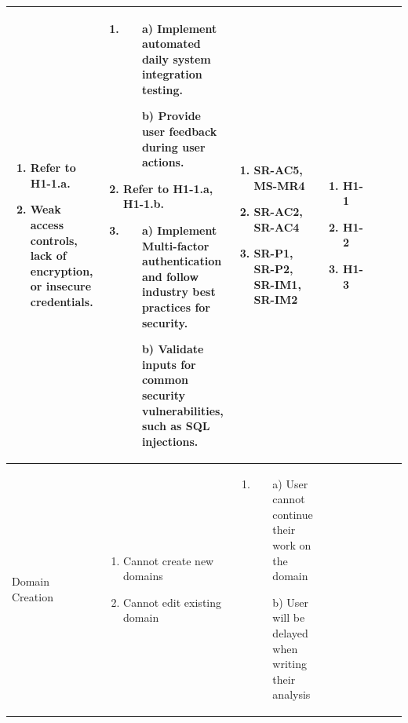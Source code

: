 \documentclass{article}
\begin{document}
\begin{landscape}
\begin{longtable}{|p{3cm}|p{3cm}|p{4cm}|p{4cm}|p{3cm}|p{2cm}|p{3cm}|}
\begin{enumerate}[leftmargin=*]
    \item Refer to H1-1.a.
    \item Weak access controls, lack of encryption, or insecure credentials.
  \end{enumerate} &
  \begin{enumerate}[leftmargin=*]
    \item 
    \begin{enumerate}
        \item[a)] Implement automated daily system integration testing.
        \item[b)] Provide user feedback during user actions.
    \end{enumerate}
    \item Refer to H1-1.a, H1-1.b.
    \item 
    \begin{enumerate}
        \item[a)] Implement Multi-factor authentication and follow industry best practices for security.
        \item[b)] Validate inputs for common security vulnerabilities, such as SQL injections.
    \end{enumerate}
  \end{enumerate} &
  \begin{enumerate}[leftmargin=*]
    \item SR-AC5, MS-MR4
    \item SR-AC2, SR-AC4
    \item SR-P1, SR-P2, SR-IM1, SR-IM2 
  \end{enumerate} &
  \begin{enumerate}[leftmargin=*]
    \item H1-1
    \item H1-2
    \item H1-3
  \end{enumerate} \\
  \hline
    Domain Creation & 
  \begin{enumerate}[leftmargin=*]
      \item Cannot create new domains
      \item Cannot edit existing domain
  \end{enumerate} & 
  \begin{enumerate}[leftmargin=*]
    \item
    \begin{enumerate}
        \item[a)] User cannot continue their work on the domain
        \item[b)] User will be delayed when writing their analysis

\end{enumerate}
\end{enumerate}
\end{longtable}
\end{landscape}
\end{document}
